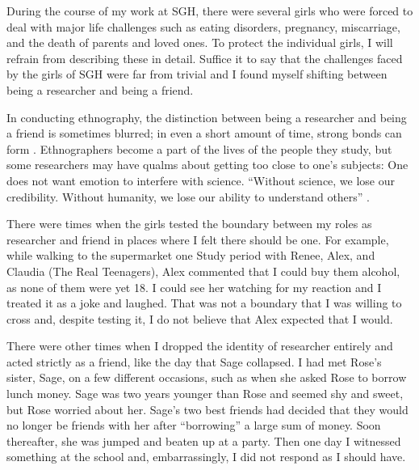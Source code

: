 During the course of my work at SGH, there were several girls who were forced to deal with major life challenges such as eating disorders, pregnancy, miscarriage, and the death of parents and loved ones. To protect the individual girls, I will refrain from describing these in detail. Suffice it to say that the challenges faced by the girls of SGH were far from trivial and I found myself shifting between being a researcher and being a friend.

In conducting ethnography, the distinction between being a researcher and being a friend is sometimes blurred; in even a short amount of time, strong bonds can form \citep[79]{milroy1987}. Ethnographers become a part of the lives of the people they study, but some researchers may have qualms about getting too close to one's subjects: One does not want emotion to interfere with science. ``Without science, we lose our credibility. Without humanity, we lose our ability to understand others'' \citep[13]{agar1980}.

There were times when the girls tested the boundary between my roles as researcher and friend in places where I felt there should be one. For example, while walking to the supermarket one Study period with Renee, Alex, and Claudia (The Real Teenagers), Alex commented that I could buy them alcohol, as none of them were yet 18. I could see her watching for my reaction and I treated it as a joke and laughed. That was not a boundary that I was willing to cross and, despite testing it, I do not believe that Alex expected that I would.



There were other times when I dropped the identity of researcher entirely and acted strictly as a friend, like the day that Sage collapsed. I had met Rose's sister, Sage, on a few different occasions, such as when she asked Rose to borrow lunch money. Sage was two years younger than Rose and seemed shy and sweet, but Rose worried about her. Sage's two best friends had decided that they would no longer be friends with her after ``borrowing'' a large sum of money. Soon thereafter, she was jumped and beaten up at a party. Then one day I witnessed something at the school and, embarrassingly, I did not respond as I should have. 

